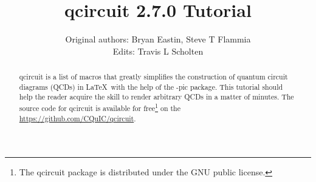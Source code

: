 \documentclass[twocolumn,nofootinbib]{revtex4}
\begin{document}
\lstset{language=TeX}

\title{qcircuit 2.7.0 Tutorial}

\author{Original authors: Bryan Eastin, Steve T Flammia\\ Edits: Travis L Scholten}
	
\begin{abstract}qcircuit is a list of macros that greatly simplifies the construction of 
quantum circuit diagrams (QCDs) in \LaTeX \ with the help of the \Xy-pic 
package.  This tutorial should help the reader acquire 
the skill to render arbitrary QCDs in a matter of minutes. The source code for qcircuit is available for free\footnote{The qcircuit package is distributed under the GNU public license.} on the \href{CQuIC GitHub page}{https://github.com/CQuIC/qcircuit}.
\end{abstract}

\maketitle
\end{document}
